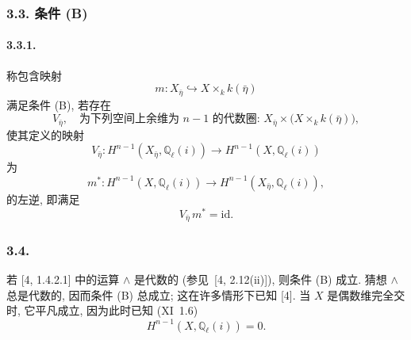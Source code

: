 \subsubsection*{3.3. 条件 (B)}

\paragraph{3.3.1.}
称包含映射
\begin{equation*}
m:X_{\bar\eta}\hookrightarrow X\times_k k(\bar\eta)
\end{equation*}
满足条件 (B), 若存在
\begin{equation}\tag{3.3.2}
V_{\bar\eta},\quad
\text{为下列空间上余维为 $n-1$ 的代数圈: }
X_{\bar\eta}\times\bigl(X\times_k k(\bar\eta)\bigr),
\end{equation}
使其定义的映射
\begin{equation}\tag{3.3.3}
V_{\bar\eta}:H^{n-1}(X_{\bar\eta},\mathbb Q_\ell(i))
\longrightarrow H^{n-1}(X,\mathbb Q_\ell(i))
\end{equation}
为
\begin{equation}\tag{3.3.4}
m^*:H^{n-1}(X,\mathbb Q_\ell(i))
\longrightarrow H^{n-1}(X_{\bar\eta},\mathbb Q_\ell(i)),
\end{equation}
的左逆, 即满足
\begin{equation}\tag{3.3.5}
V_{\bar\eta}\,m^*=\mathrm{id}.
\end{equation}

\subsubsection*{3.4.}
若 [4, 1.4.2.1] 中的运算 $\wedge$ 是代数的 (参见~[4, 2.12(ii)]), 则条件 (B) 成立. 猜想 $\wedge$ 总是代数的, 因而条件 (B) 总成立; 这在许多情形下已知 [4]. 当 $X$ 是偶数维完全交时, 它平凡成立, 因为此时已知 (XI~1.6)
\begin{equation}\tag{3.4.1}
H^{n-1}(X,\mathbb Q_\ell(i))=0.
\end{equation}
